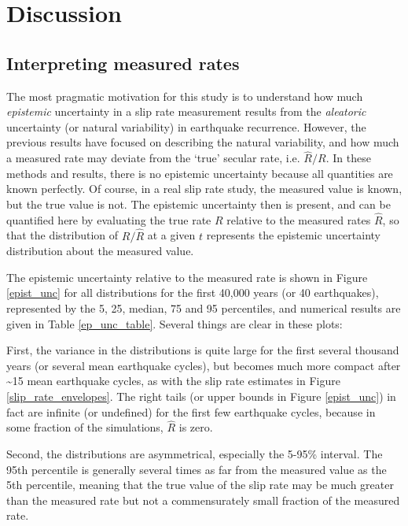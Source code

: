 \documentclass[se, manuscript]{copernicus}
\begin{document}
\section{Discussion}\label{discussion}

\subsection{Interpreting measured
rates}\label{interpreting-measured-rates}

The most pragmatic motivation for this study is to understand how much
\emph{epistemic} uncertainty in a slip rate measurement results from the
\emph{aleatoric} uncertainty (or natural variability) in earthquake
recurrence. However, the previous results have focused on describing the
natural variability, and how much a measured rate may deviate from the
`true' secular rate, i.e. \(\hat{R}/R\). In these methods and results,
there is no epistemic uncertainty because all quantities are known
perfectly. Of course, in a real slip rate study, the measured value is
known, but the true value is not. The epistemic uncertainty then is
present, and can be quantified here by evaluating the true rate \(R\)
relative to the measured rates \(\hat{R}\), so that the distribution of
\(R / \hat{R}\) at a given \(t\) represents the epistemic uncertainty
distribution about the measured value.

The epistemic uncertainty relative to the measured rate is shown in
Figure \ref{epist_unc} for all distributions for the first 40,000 years
(or 40 earthquakes), represented by the 5, 25, median, 75 and 95
percentiles, and numerical results are given in Table
\ref{ep_unc_table}. Several things are clear in these plots:

First, the variance in the distributions is quite large for the first
several thousand years (or several mean earthquake cycles), but becomes
much more compact after \textasciitilde{}15 mean earthquake cycles, as
with the slip rate estimates in Figure \ref{slip_rate_envelopes}. The
right tails (or upper bounds in Figure \ref{epist_unc}) in fact are
infinite (or undefined) for the first few earthquake cycles, because in
some fraction of the simulations, \(\hat{R}\) is zero.

Second, the distributions are asymmetrical, especially the 5-95\%
interval. The 95th percentile is generally several times as far from the
measured value as the 5th percentile, meaning that the true value of the
slip rate may be much greater than the measured rate but not a
commensurately small fraction of the measured rate.
\end{document}
